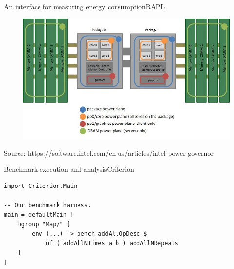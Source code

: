 
    \begin{frame}{An interface for measuring energy consumption}{RAPL}

        \begin{figure}[h]

            \centering


            \includegraphics[width=1\textwidth]{images/power_domains2.jpg}


        \end{figure}

        \footnotesize{Source: https://software.intel.com/en-us/articles/intel-power-governor}


    \end{frame}



    \begin{frame}[fragile]{Benchmark execution and analysis}{Criterion}

        \begin{verbatim}
import Criterion.Main

-- Our benchmark harness.
main = defaultMain [
    bgroup "Map/" [
        env (...) -> bench addAllOpDesc $
            nf ( addAllNTimes a b ) addAllNRepeats
    ]
]
        \end{verbatim}


    \end{frame}



